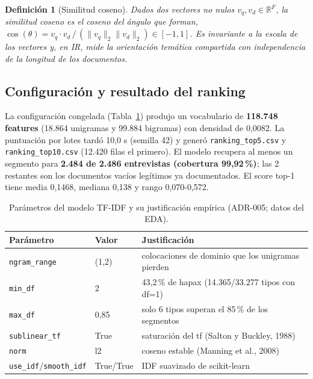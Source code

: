 \documentclass[11pt]{tg_usta}
\newtheorem{definicion}{Definición}[section]
\begin{document}
\begin{definicion}[Similitud coseno]
Dados dos vectores no nulos $v_q, v_d \in \mathbb{R}^{F}$, la similitud coseno es el coseno del ángulo que forman, $\cos(\theta)=v_q\cdot v_d\,/\,(\lVert v_q\rVert_2\lVert v_d\rVert_2)\in[-1,1]$. Es invariante a la escala de los vectores y, en IR, mide la orientación temática compartida con independencia de la longitud de los documentos.
\end{definicion}

\subsection{Configuración y resultado del ranking}

La configuración congelada (Tabla~\ref{tab:config-tfidf}) produjo un vocabulario de \textbf{118.748 features} (18.864 unigramas y 99.884 bigramas) con densidad de 0,0082. La puntuación por lotes tardó 10,0 s (semilla 42) y generó \texttt{ranking\_top5.csv} y \texttt{ranking\_top10.csv} (12.420 filas el primero). El modelo recupera al menos un segmento para \textbf{2.484 de 2.486 entrevistas (cobertura 99,92\,\%)}; las 2 restantes son los documentos vacíos legítimos ya documentados. El score top-1 tiene media 0,1468, mediana 0,138 y rango 0,070-0,572.

\begin{table}[H]
    \centering
    \caption{Parámetros del modelo TF-IDF y su justificación empírica (ADR-005; datos del EDA).}
    \small
    \setlength{\tabcolsep}{5pt}
    \begin{tabular}{l l p{7.1cm}}
    \toprule
    Parámetro & Valor & Justificación \\
    \midrule
    \texttt{ngram\_range} & (1,2) & colocaciones de dominio que los unigramas pierden \\
    \texttt{min\_df} & 2 & 43,2\,\% de hapax (14.365/33.277 tipos con df=1) \\
    \texttt{max\_df} & 0,85 & solo 6 tipos superan el 85\,\% de los segmentos \\
    \texttt{sublinear\_tf} & True & saturación del tf (Salton y Buckley, 1988) \\
    \texttt{norm} & l2 & coseno estable (Manning et al., 2008) \\
    \texttt{use\_idf}/\texttt{smooth\_idf} & True/True & IDF suavizado de scikit-learn \\
    \bottomrule
    \end{tabular}
    \label{tab:config-tfidf}
\end{table}
\end{document}
